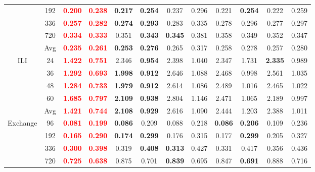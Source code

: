 \begin{table}[!htbp]
\begin{tabular}{c|c|cc|cc|cc|cc|cc}
& 192 & \textbf{\textcolor{red}{0.200}} & \textbf{\textcolor{red}{0.238}} & \textbf{0.217} & \textbf{0.254} & 0.237 & 0.296 & 0.221 & \textbf{0.254} & 0.222 & 0.259 \\
& 336 & \textbf{\textcolor{red}{0.257}} & \textbf{\textcolor{red}{0.282}} & \textbf{0.274} & \textbf{0.293} & 0.283 & 0.335 & 0.278 & 0.296 & 0.277 & 0.297 \\
& 720 & \textbf{\textcolor{red}{0.334}} & \textbf{\textcolor{red}{0.333}} & 0.351 & \textbf{0.343} & \textbf{0.345} & 0.381 & 0.358 & 0.349 & 0.352 & 0.347 \\
& Avg & \textbf{\textcolor{red}{0.235}} & \textbf{\textcolor{red}{0.261}} & \textbf{0.253} & \textbf{0.276} & 0.265 & 0.317 & 0.258 & 0.278 & 0.257 & 0.280 \\
\midrule
\multirow{5}{*}{ILI}
& 24 & \textbf{\textcolor{red}{1.422}} & \textbf{\textcolor{red}{0.751}} & 2.346 & \textbf{0.954} & 2.398 & 1.040 & 2.347 & 1.731 & \textbf{2.335} & 0.989 \\
& 36 & \textbf{\textcolor{red}{1.292}} & \textbf{\textcolor{red}{0.693}} & \textbf{1.998} & \textbf{0.912} & 2.646 & 1.088 & 2.468 & 0.998 & 2.561 & 1.035 \\
& 48 & \textbf{\textcolor{red}{1.284}} & \textbf{\textcolor{red}{0.733}} & \textbf{1.979} & \textbf{0.912} & 2.614 & 1.086 & 2.489 & 1.016 & 2.465 & 1.022 \\
& 60 & \textbf{\textcolor{red}{1.685}} & \textbf{\textcolor{red}{0.797}} & \textbf{2.109} & \textbf{0.938} & 2.804 & 1.146 & 2.471 & 1.065 & 2.189 & 0.997 \\
& Avg & \textbf{\textcolor{red}{1.421}} & \textbf{\textcolor{red}{0.744}} & \textbf{2.108} & \textbf{0.929} & 2.616 & 1.090 & 2.444 & 1.203 & 2.388 & 1.011 \\
\midrule
\multirow{5}{*}{Exchange}
& 96 & \textbf{\textcolor{red}{0.081}} & \textbf{\textcolor{red}{0.199}} & \textbf{0.086} & 0.209 & 0.088 & 0.218 & \textbf{0.086} & \textbf{0.206} & 0.109 & 0.236 \\
& 192 & \textbf{\textcolor{red}{0.165}} & \textbf{\textcolor{red}{0.290}} & \textbf{0.174} & \textbf{0.299} & 0.176 & 0.315 & 0.177 & \textbf{0.299} & 0.205 & 0.327 \\
& 336 & \textbf{\textcolor{red}{0.300}} & \textbf{\textcolor{red}{0.398}} & 0.319 & \textbf{0.408} & \textbf{0.313} & 0.427 & 0.331 & 0.417 & 0.356 & 0.436 \\
& 720 & \textbf{\textcolor{red}{0.725}} & \textbf{\textcolor{red}{0.638}} & 0.875 & 0.701 & \textbf{0.839} & 0.695 & 0.847 & \textbf{0.691} & 0.888 & 0.716 \\

\end{tabular}
\end{table}
